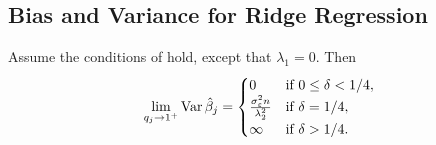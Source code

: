 \subsection{Bias and Variance for Ridge Regression}%
\label{sec:ridge-variance}

\begin{corollary}
  \label{cor:ridge-variance}
  Assume the conditions of  hold, except that
  \(\lambda_1 = 0\). Then
  \[
    \lim_{q_j \rightarrow 1^+} \operatorname{Var} \hat{\beta}_j =
    \begin{cases}
      0                                          & \text{if } 0 \leq \delta < 1/4, \\
      \frac{\sigma_\varepsilon^2 n}{\lambda_2^2} & \text{if } \delta = 1/4,        \\
      \infty                                     & \text{if } \delta > 1/4.
    \end{cases}
  \]
\end{corollary}

